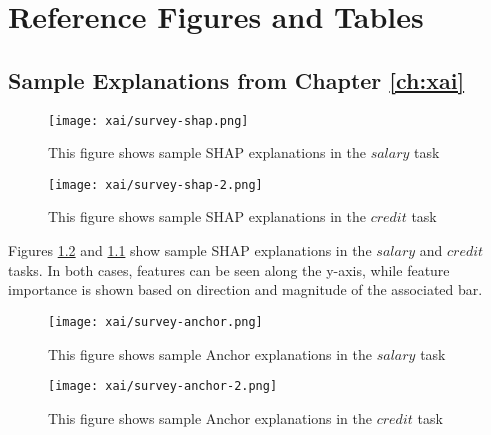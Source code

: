 

\chapter{\label{app:figures}Reference Figures and Tables}

\minitoc

\section{Sample Explanations from Chapter \ref{ch:xai}}\label{app:xaifigures}

\begin{figure}[htbp]
    \centering
    \texttt{[image: xai/survey-shap.png]}
    \caption{This figure shows sample SHAP explanations in the $salary$ task}
    \label{fig:shapsalaryfull}
\end{figure}

\begin{figure}[hbtp]
    \centering
    \texttt{[image: xai/survey-shap-2.png]}
    \caption{This figure shows sample SHAP explanations in the $credit$ task}
    \label{fig:shapcreditfull}
\end{figure}

Figures \ref{fig:shapcreditfull} and \ref{fig:shapsalaryfull} show sample SHAP explanations in the $salary$ and $credit$ tasks. In both cases, features can be seen along the y-axis, while feature importance is shown based on direction and magnitude of the associated bar.

\begin{figure}[htbp]
    \centering
    \texttt{[image: xai/survey-anchor.png]}
    \caption{This figure shows sample Anchor explanations in the $salary$ task}
    \label{fig:anchorsalaryfull}
\end{figure}

\begin{figure}[hbtp]
    \centering
    \texttt{[image: xai/survey-anchor-2.png]}
    \caption{This figure shows sample Anchor explanations in the $credit$ task}
    \label{fig:anchorcreditfull}
\end{figure}


